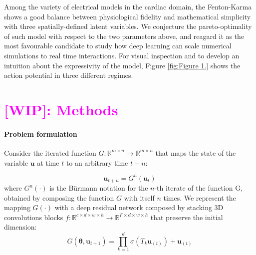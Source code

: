 \documentclass{article}
\newcommand{\WIP}[1]{\textcolor{magenta}{[WIP]: #1}}
\newcommand{\Edu}[1]{\textcolor{magenta}{<Edu>: #1}}
\begin{document}
        Among the variety of electrical models in the cardiac domain, the Fenton-Karma shows a good balance between physiological fidelity and mathematical simplicity with three spatially-defined latent variables.
        We conjecture the pareto-optimality of such model with respect to the two parameters above, and reagard it as the most favourable candidate to study how deep learning can scale numerical simulations to real time interactions.
        For visual inspection and to develop an intuition about the expressivity of the model, Figure \ref{fig:Figure 1.} shows the action potential in three different regimes. %
        
        
    \section{\WIP{Methods}}
        
        \paragraph{Problem formulation}
            Consider the iterated function $G: \mathbb{R}^{m \times n}  \rightarrow \mathbb{R}^{m \times n}$ that maps the state of the variable $\mathbf{u}$ at time $t$ to an arbitrary time $t + n$:
        
            \begin{equation}
                \mathbf{u}_{t+n} = G^n(\mathbf{u}_{t})
            \end{equation}
            where $G^n(\cdot)$ is the Bürmann notation for the $n$-th iterate of the function G, obtained by composing the function $G$ with itself $n$ times. We represent the mapping $G(\cdot)$ with a deep residual network composed by stacking 3D convolutions blocks $f: \mathbb{R}^{c \times d \times w \times h} \rightarrow \mathbb{R}^{F \times d \times w \times h}$ that preserve the initial dimension:
            \begin{equation}
                G(\mathbf{\theta}, \mathbf{u}_{t+1}) = \prod_{k=1}^{d}{\sigma(T_k \mathbf{u}_{(t)}) + \mathbf{u}_{(t)}}
            \end{equation}
            
\end{document}
